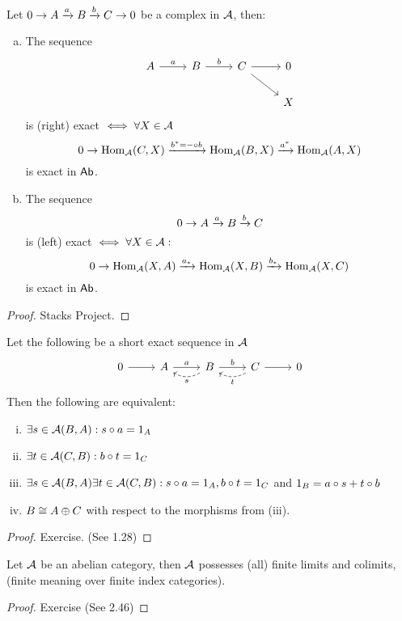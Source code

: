 \documentclass[a4paper]{report}
\begin{document}
\begin{lemm}
  Let $0 \to A \xrightarrow a B \xrightarrow b C \to 0$ be a complex in $\mathcal{A}$, then:
  \begin{enumerate}[(a)]
    \item The sequence
          \[\begin{tikzcd}
A \arrow[r, "a"] & B \arrow[r, "b"] & C \arrow[r] \arrow[rd] & 0 \\
                 &                  &                        & X
               \end{tikzcd}\]
          is (right) exact $\iff \forall X \in \mathcal{A}$
          \[0 \to \operatorname{Hom}_{\mathcal{A}}(C,X) \xrightarrow {b^{*} = - \circ b} \operatorname{Hom}_{\mathcal{A}}(B,X) \xrightarrow {a^{*}} \operatorname{Hom}_{\mathcal{A}}(A,X)\]
          is exact in $\mathsf{Ab}$.
    \item The sequence
          \[0 \to A \xrightarrow a B \xrightarrow b C\]
          is (left) exact $\iff \forall X \in \mathcal{A}:$
          \[0 \to \operatorname{Hom}_{\mathcal{A}}(X,A) \xrightarrow{a_{*}} \operatorname{Hom}_{\mathcal{A}}(X,B) \xrightarrow {b_*} \operatorname{Hom}_{\mathcal{A}}(X,C)\]
          is exact in $\mathsf{Ab}$.
  \end{enumerate}
\begin{proof}
Stacks Project.
\end{proof}
\end{lemm}

\begin{prop}
  Let the following be a short exact sequence in $\mathcal{A}$
\[\begin{tikzcd}
0 \arrow[r] & A \arrow[r, "a"] & B \arrow[r, "b"] \arrow[l, "s", dashed, bend left] & C \arrow[r] \arrow[l, "t", dashed, bend left] & 0
\end{tikzcd}\]
Then the following are equivalent:
\begin{enumerate}[(i)]
\item $\exists s \in \mathcal{A}(B,A) : s \circ a = 1_{A}$
  \item $\exists t \in \mathcal{A}(C,B) : b \circ t = 1_{C}$
  \item $\exists s \in \mathcal{A}(B,A) \exists t \in \mathcal{A}(C, B) : s \circ a = 1_{A}, b \circ t = 1_{C}$ and $1_{B} = a \circ s + t \circ b$
  \item $B \cong A \oplus C$ with respect to the morphisms from (iii).
\end{enumerate}

        \begin{proof}
          Exercise. (See 1.28)
        \end{proof}
\end{prop}

\begin{prop}
  Let $\mathcal{A}$ be an abelian category, then $\mathcal{A}$ possesses (all) finite limits and colimits, (finite meaning over finite index categories).
\begin{proof}
Exercise (See 2.46)
\end{proof}
\end{prop}
\end{document}
